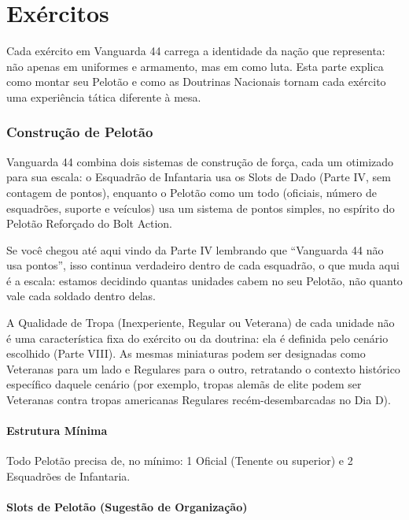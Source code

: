 \part{Exércitos}

Cada exército em Vanguarda 44 carrega a identidade da nação que representa: não apenas em uniformes e armamento, mas em como luta. Esta parte explica como montar seu Pelotão e como as Doutrinas Nacionais tornam cada exército uma experiência tática diferente à mesa.

\section{Construção de Pelotão}

Vanguarda 44 combina dois sistemas de construção de força, cada um otimizado para sua escala: o Esquadrão de Infantaria usa os Slots de Dado (Parte IV, sem contagem de pontos), enquanto o Pelotão como um todo (oficiais, número de esquadrões, suporte e veículos) usa um sistema de pontos simples, no espírito do Pelotão Reforçado do Bolt Action.

Se você chegou até aqui vindo da Parte IV lembrando que ``Vanguarda 44 não usa pontos'', isso continua verdadeiro dentro de cada esquadrão, o que muda aqui é a escala: estamos decidindo quantas unidades cabem no seu Pelotão, não quanto vale cada soldado dentro delas.

\begin{nota}
A Qualidade de Tropa (Inexperiente, Regular ou Veterana) de cada unidade não é uma característica fixa do exército ou da doutrina: ela é definida pelo cenário escolhido (Parte VIII). As mesmas miniaturas podem ser designadas como Veteranas para um lado e Regulares para o outro, retratando o contexto histórico específico daquele cenário (por exemplo, tropas alemãs de elite podem ser Veteranas contra tropas americanas Regulares recém-desembarcadas no Dia D).
\end{nota}

\subsection{Estrutura Mínima}

Todo Pelotão precisa de, no mínimo: 1 Oficial (Tenente ou superior) e 2 Esquadrões de Infantaria.

\subsection{Slots de Pelotão (Sugestão de Organização)}


